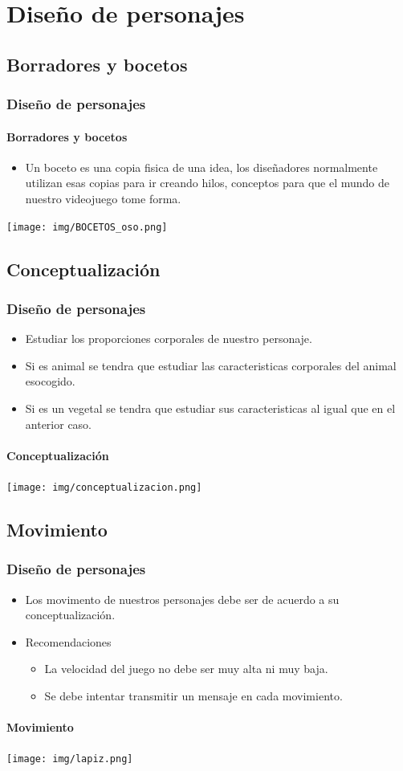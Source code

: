 \documentclass[11pt]{beamer}
\begin{document}
\section{Diseño de personajes}
\subsection{Borradores y bocetos}
\begin{frame}
\frametitle{Diseño de personajes}
\framesubtitle{Borradores y bocetos}
\begin{itemize}
\item Un boceto es una copia fisica de una idea, los diseñadores normalmente  utilizan esas copias para ir creando hilos, conceptos para que el mundo de nuestro videojuego tome forma.
\end{itemize}
\begin{center}
 \texttt{[image: img/BOCETOS\_oso.png]}
\end{center}
\end{frame}

\subsection{Conceptualización}
\begin{frame}
\frametitle{Diseño de personajes}
\begin{itemize}
\item Estudiar los proporciones corporales de nuestro personaje.
\item Si es animal se tendra que estudiar las caracteristicas corporales del animal esocogido.
\item Si es un vegetal se tendra que estudiar sus caracteristicas al igual que en el anterior caso.
\end{itemize}
\framesubtitle{Conceptualización}
\begin{center}
 \texttt{[image: img/conceptualizacion.png]}
\end{center}
\end{frame}

\subsection{Movimiento}
\begin{frame}
\frametitle{Diseño de personajes}
\begin{itemize}
\item Los movimento de nuestros personajes debe ser de acuerdo a su conceptualización.
\item Recomendaciones
	\begin{itemize}
	\item 	La velocidad del juego no debe ser muy alta ni muy baja.
	\item 	Se debe intentar transmitir un mensaje en cada movimiento.
	
	\end{itemize}
\end{itemize}
\framesubtitle{Movimiento}
\begin{center}
 \texttt{[image: img/lapiz.png]}
\end{center}
\end{frame}
\end{document}
